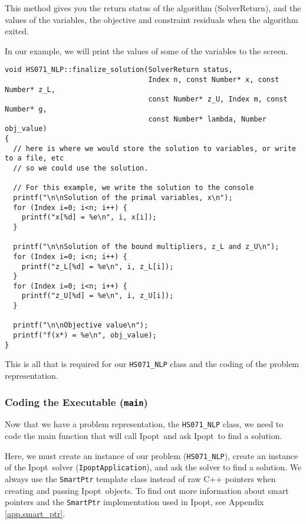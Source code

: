 \documentclass[letter,10pt]{article}
\newcommand{\Ipopt}{{\sc Ipopt}}
\begin{document}
This method gives you the return status of the algorithm
(SolverReturn), and the values of the variables, 
the objective and constraint residuals when the algorithm exited.

In our example, we will print the values of some of the variables to 
the screen.

\begin{footnotesize}
\begin{verbatim}
void HS071_NLP::finalize_solution(SolverReturn status,
                                  Index n, const Number* x, const Number* z_L,
                                  const Number* z_U, Index m, const Number* g,
                                  const Number* lambda, Number obj_value)
{
  // here is where we would store the solution to variables, or write to a file, etc
  // so we could use the solution. 

  // For this example, we write the solution to the console
  printf("\n\nSolution of the primal variables, x\n");
  for (Index i=0; i<n; i++) {
    printf("x[%d] = %e\n", i, x[i]); 
  }

  printf("\n\nSolution of the bound multipliers, z_L and z_U\n");
  for (Index i=0; i<n; i++) {
    printf("z_L[%d] = %e\n", i, z_L[i]); 
  }
  for (Index i=0; i<n; i++) {
    printf("z_U[%d] = %e\n", i, z_U[i]); 
  }

  printf("\n\nObjective value\n");
  printf("f(x*) = %e\n", obj_value); 
}
\end{verbatim}
\end{footnotesize}

This is all that is required for our {\tt HS071\_NLP} class and 
the coding of the problem representation.
 
\subsubsection{Coding the Executable (\texttt{main})}
Now that we have a problem representation, the {\tt HS071\_NLP} class,
we need to code the main function that will call \Ipopt\ and ask \Ipopt\
to find a solution.

Here, we must create an instance of our problem ({\tt HS071\_NLP}),
create an instance of the \Ipopt\ solver (\texttt{IpoptApplication}),
and ask the solver to find a solution. We always use the
\texttt{SmartPtr} template class instead of raw C++ pointers when
creating and passing \Ipopt\ objects. To find out more information
about smart pointers and the {\tt SmartPtr} implementation used in
\Ipopt, see Appendix \ref{app.smart_ptr}.
\end{document}
